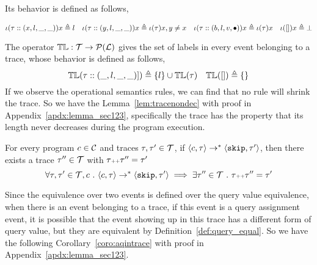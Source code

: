   Its behavior is defined as follows,
  \begin{defn}
    \[
    \iota(\mathtt{\tau}  :: (x, l, \_, \_)) x \triangleq l
    ~~~
    \iota(\mathtt{\tau}  :: (y, l, \_, \_)) x \triangleq \iota(\mathtt{\tau} ) x, y \neq x
    ~~~
    \iota(\mathtt{\tau} :: (b, l, v, \bullet)) x \triangleq \iota(\mathtt{\tau}) x
    ~~~
    \iota({[]}) x \triangleq \bot
    \]
  \end{defn}
    The operator $\mathbb{TL} : \mathcal{T} \to \mathcal{P}{(\mathcal{L})}$ gives the set of labels in every event belonging to 
    a trace, whose behavior is defined as follows,
  \[
  \mathbb{TL}{(\mathtt{\tau}  :: (\_, l, \_, \_)])} \triangleq \{l\} \cup \mathbb{TL}{(\mathtt{\tau} )}
  ~~~
  \mathbb{TL}({[ ]}) \triangleq \{\}
  \]
  If we observe the operational semantics rules, we can find that no rule will shrink the trace. 
  So we have the Lemma~\ref{lem:tracenondec} with proof in Appendix~\ref{apdx:lemma_sec123}, 
  specifically the trace has the property that its length never decreases during the program execution.
  \begin{lem}
  \label{lem:tracenondec}
  For every program $c \in \mathcal{C}$ and traces $\mathtt{\tau}, \mathtt{\tau}' \in \mathcal{T}$, if 
  $\langle c, \mathtt{\tau} \rangle \rightarrow^{*} \langle \mathtt{skip}, \mathtt{\tau}' \rangle$,
  then there exists a trace $\mathtt{\tau}'' \in \mathcal{T}$ with $\mathtt{\tau} {\scriptscriptstyle ++} \mathtt{\tau}'' = \mathtt{\tau}'$
  $$
  \forall \mathtt{\tau}, \mathtt{\tau}' \in \mathcal{T}, c ~.~ 
  \langle c, \mathtt{\tau} \rangle \rightarrow^{*} \langle \mathtt{skip}, \mathtt{\tau}' \rangle 
  \implies \exists \mathtt{\tau}'' \in \mathcal{T} ~.~ \mathtt{\tau} {\scriptscriptstyle ++} \mathtt{\tau}'' = \mathtt{\tau}'
  $$
  \end{lem}
  Since the equivalence over two events is defined over the query value equivalence, 
  when there is an event belonging to a trace, 
  if this event is a query assignment event, 
  it is possible that 
  the event showing up in this trace has a different form of query value, 
  but they are equivalent by Definition~\ref{def:query_equal}.
  So we have the following Corollary~\ref{coro:aqintrace} with proof in Appendix~\ref{apdx:lemma_sec123}.
